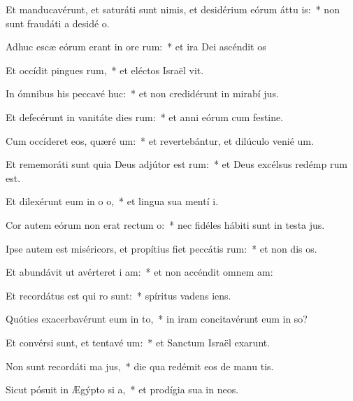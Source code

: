 \item Et manducavérunt, et saturáti sunt nimis, et desidérium eórum áttu is:~* non sunt fraudáti a desidé o.
\item Adhuc escæ eórum erant in ore rum:~* et ira Dei ascéndit  os
\item Et occídit pingues rum,~* et eléctos Israël vit.
\item In ómnibus his peccavé huc:~* et non credidérunt in mirabí jus.
\item Et defecérunt in vanitáte dies rum:~* et anni eórum cum festine.
\item Cum occíderet eos, quæré um:~* et revertebántur, et dilúculo venié  um.
\item Et rememoráti sunt quia Deus adjútor est rum:~* et Deus excélsus redémp rum est.
\item Et dilexérunt eum in o o,~* et lingua sua mentí  i.
\item Cor autem eórum non erat rectum  o:~* nec fidéles hábiti sunt in testa jus.
\item Ipse autem est miséricors, et propítius fiet peccátis rum:~* et non dis os.
\item Et abundávit ut avérteret i am:~* et non accéndit omnem  am:
\item Et recordátus est qui ro sunt:~* spíritus vadens   iens.
\item Quóties exacerbavérunt eum in to,~* in iram concitavérunt eum in so?
\item Et convérsi sunt, et tentavé um:~* et Sanctum Israël exarunt.
\item Non sunt recordáti ma jus,~* die qua redémit eos de manu tis.
\item Sicut pósuit in Ægýpto si a,~* et prodígia sua in  neos.
